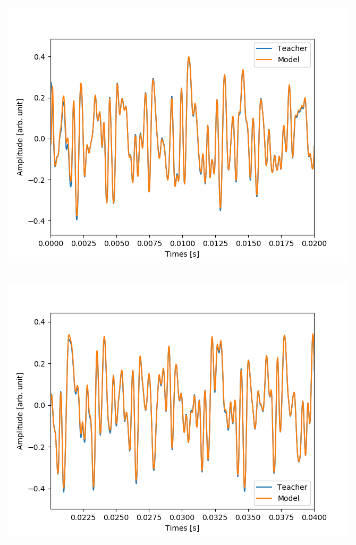 \documentclass{jreport}		%
\begin{document}
\newpage
\begin{figure}[htbp]
 \begin{minipage}{0.5\hsize}
 \begin{center}
  \includegraphics[width=90mm]{gain10_output_hikaku.png}
 \end{center}
 \label{fig:one}
 \end{minipage}
 \begin{minipage}{0.5\hsize}
 \begin{center}
  \includegraphics[width=90mm]{gain10_output_hikaku2.png}
 \end{center}
 \label{fig:two}
 \end{minipage}
\end{figure}
\end{document}
